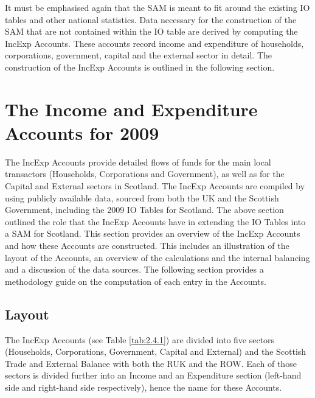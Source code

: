 \bigskip

It must be emphasised again that the SAM is meant to fit around the existing IO tables and other national statistics. Data necessary for the construction of the SAM that are not contained within the IO table are derived by computing the IncExp Accounts. These accounts record income and expenditure of households, corporations, government, capital and the external sector in detail. The construction of the IncExp Accounts is outlined in the following section.

\newpage
\section{The Income and Expenditure Accounts for 2009}
\label{sec:2.4}

The IncExp Accounts provide detailed flows of funds for the main local transactors (Households, Corporations and Government), as well as for the Capital and External sectors in Scotland. The IncExp Accounts are compiled by using publicly available data, sourced from both the UK and the Scottish Government, including the 2009 IO Tables for Scotland. The above section outlined the role that the IncExp Accounts have in extending the IO Tables into a SAM for Scotland. This section provides an overview of the IncExp Accounts and how these Accounts are constructed. This includes an illustration of the layout of the Accounts, an overview of the calculations and the internal balancing and a discussion of the data sources. The following section provides a methodology guide on the computation of each entry in the Accounts.

\bigskip

\subsection{Layout}
\label{sec:2.4.1}

\bigskip

The IncExp Accounts (see Table \ref{tab:2.4.1}) are divided into five sectors (Households, Corporations, Government, Capital and External) and the Scottish Trade and External Balance with both the RUK and the ROW. Each of those sectors is divided further into an Income and an Expenditure section (left-hand side and right-hand side respectively), hence the name for these Accounts.

\bigskip

